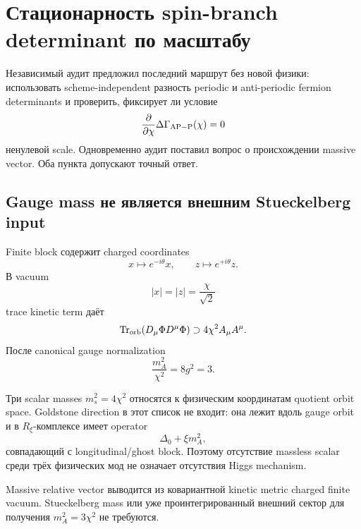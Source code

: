 \chapter{Стационарность spin-branch determinant по масштабу}

Независимый аудит предложил последний маршрут без новой физики: использовать
scheme-independent разность periodic и anti-periodic fermion determinants и
проверить, фиксирует ли условие
\begin{equation}
 \frac{\partial}{\partial\chi}
 \Delta\Gamma_{\rm AP-P}(\chi)=0
\end{equation}
ненулевой scale. Одновременно аудит поставил вопрос о происхождении massive
vector. Оба пункта допускают точный ответ.

\section{Gauge mass не является внешним Stueckelberg input}

Finite block содержит charged coordinates
\begin{equation}
 x\mapsto e^{-i\theta}x,
 \qquad
 z\mapsto e^{+i\theta}z.
\end{equation}
В vacuum
\begin{equation}
 |x|=|z|=\frac{\chi}{\sqrt2}
\end{equation}
trace kinetic term даёт
\begin{equation}
 \operatorname{Tr}_{\rm orb}(D_\mu\Phi D^\mu\Phi)
 \supset4\chi^2A_\mu A^\mu.
\end{equation}
После canonical gauge normalization
\begin{equation}
 \frac{m_A^2}{\chi^2}=8g^2=3.
\end{equation}

Три scalar masses \(m_s^2=4\chi^2\) относятся к физическим координатам
quotient orbit space. Goldstone direction в этот список не входит: она
лежит вдоль gauge orbit и в \(R_\xi\)-комплексе имеет operator
\begin{equation}
 \Delta_0+\xi m_A^2,
\end{equation}
совпадающий с longitudinal/ghost block. Поэтому отсутствие massless scalar
среди трёх физических мод не означает отсутствия Higgs mechanism.

\begin{proposition}
Massive relative vector выводится из ковариантной kinetic metric charged
finite vacuum. Stueckelberg mass или уже проинтегрированный внешний сектор
для получения \(m_A^2=3\chi^2\) не требуются.
\end{proposition}

